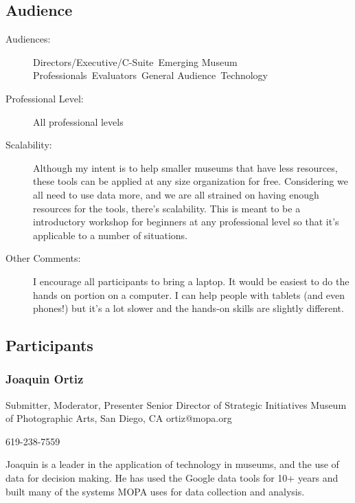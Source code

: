 \documentclass{report}
\begin{document}
              \subsection*{Audience}
                \begin{description}
                  \item [Audiences:]Directors/Executive/C-Suite~Emerging Museum Professionals~Evaluators~General Audience~Technology~
                  \item[Professional Level:]All professional levels~
                \item[Scalability:] Although my intent is to help smaller museums that have less resources, these tools can be applied at any size organization for free. Considering we all need to use data more, and we are all strained on having enough resources for the tools, there's scalability. This is meant to be a introductory workshop for beginners at any professional level so that it's applicable to a number of situations.

							
              \item[Other Comments:] I encourage all participants to bring a laptop. It would be easiest to do the hands on portion on a computer. I can help people with tablets (and even phones!) but it's a lot slower and the hands-on skills are slightly different.
              \end{description}
            \subsection*{Participants}
              \subsubsection*{ Joaquin Ortiz }
              Submitter, Moderator, Presenter\newline
              Senior Director of Strategic Initiatives\newline
              Museum of Photographic Arts, San Diego, CA
              \newline
              ortiz@mopa.org\newline
              
              619-238-7559\newline

              Joaquin is a leader in the application of technology in museums, and the use of data for decision making. He has used the Google data tools for 10+ years and built many of the systems MOPA uses for data collection and analysis.\newline
\end{document}
